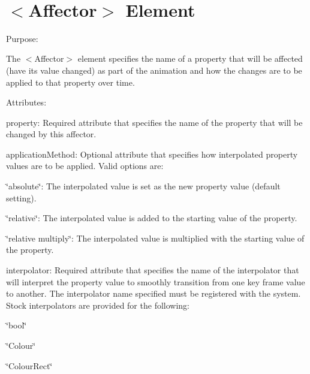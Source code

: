 ~\newline
 \hypertarget{xml_animation_xml_animation_affector}{}\section{$<$\+Affector$>$ Element}\label{xml_animation_xml_animation_affector}

\begin{DoxyItemize}
\item Purpose\+:
\begin{DoxyItemize}
\item The $<$Affector$>$ element specifies the name of a property that will be affected (have it\textquotesingle{}s value changed) as part of the animation and how the changes are to be applied to that property over time.
\end{DoxyItemize}
\item Attributes\+:
\begin{DoxyItemize}
\item {\ttfamily property\+:} Required attribute that specifies the name of the property that will be changed by this affector.
\item {\ttfamily application\+Method\+:} Optional attribute that specifies how interpolated property values are to be applied. Valid options are\+:
\begin{DoxyItemize}
\item {\ttfamily \char`\"{}absolute\char`\"{}}\+: The interpolated value is set as the new property value (default setting).
\item {\ttfamily \char`\"{}relative\char`\"{}}\+: The interpolated value is added to the starting value of the property.
\item {\ttfamily \char`\"{}relative multiply\char`\"{}}\+: The interpolated value is multiplied with the starting value of the property.
\end{DoxyItemize}
\item {\ttfamily interpolator\+:} Required attribute that specifies the name of the interpolator that will interpret the property value to smoothly transition from one key frame value to another. The interpolator name specified must be registered with the system. Stock interpolators are provided for the following\+:
\begin{DoxyItemize}
\item {\ttfamily \char`\"{}bool\char`\"{}} 
\item {\ttfamily \char`\"{}\+Colour\char`\"{}} 
\item {\ttfamily \char`\"{}\+Colour\+Rect\char`\"{}} 

\end{DoxyItemize}
\end{DoxyItemize}
\end{DoxyItemize}
